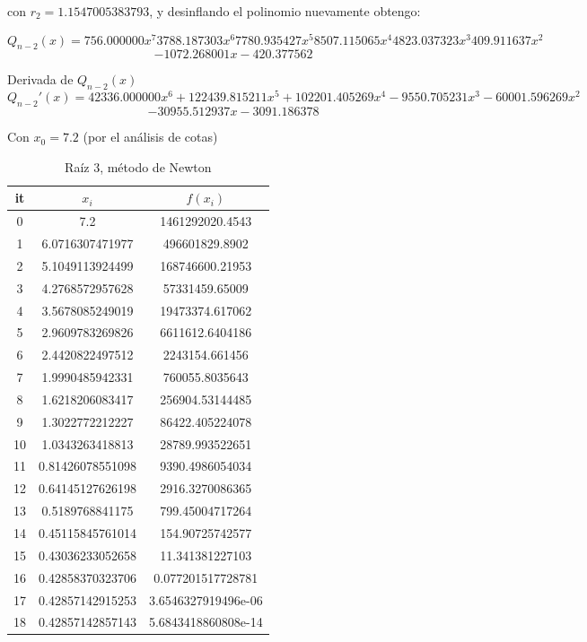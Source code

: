 \documentclass{article} %
\begin{document}
con $r_2 = 1.1547005383793$, y desinflando el polinomio nuevamente obtengo:

\begin{equation*}
    Q_{n-2}(x) = 756.000000x^7 3788.187303x^6 7780.935427x^5 8507.115065x^4 4823.037323x^3 409.911637x^2
\end{equation*}
\begin{equation*}
     -1072.268001x -420.377562
\end{equation*}

Derivada de $Q_{n-2}(x)$
\begin{equation*}
    Q_{n-2}'(x) = 42336.000000x^6 + 122439.815211x^5 + 102201.405269x^4 -9550.705231x^3 -60001.596269x^2
\end{equation*}
\begin{equation*}
    -30955.512937x -3091.186378
\end{equation*}

Con $x_0 = 7.2$ (por el análisis de cotas) 
\begin{table}[H]
\centering
\begin{tabular}{|c|c|c|}
\hline
it & $x_i$ & $f(x_i)$\\
\hline
0 & 7.2 & 1461292020.4543\\
1 & 6.0716307471977 & 496601829.8902\\
2 & 5.1049113924499 & 168746600.21953\\
3 & 4.2768572957628 & 57331459.65009\\
4 & 3.5678085249019 & 19473374.617062\\
5 & 2.9609783269826 & 6611612.6404186\\
6 & 2.4420822497512 & 2243154.661456\\
7 & 1.9990485942331 & 760055.8035643\\
8 & 1.6218206083417 & 256904.53144485\\
9 & 1.3022772212227 & 86422.405224078\\
10 & 1.0343263418813 & 28789.993522651\\
11 & 0.81426078551098 & 9390.4986054034\\
12 & 0.64145127626198 & 2916.3270086365\\
13 & 0.5189768841175 & 799.45004717264\\
14 & 0.45115845761014 & 154.90725742577\\
15 & 0.43036233052658 & 11.341381227103\\
16 & 0.42858370323706 & 0.077201517728781\\
17 & 0.42857142915253 & 3.6546327919496e-06\\
18 & 0.42857142857143 & 5.6843418860808e-14\\
\hline
\end{tabular}
\caption{Raíz 3, método de Newton}
\end{table}
\end{document}
